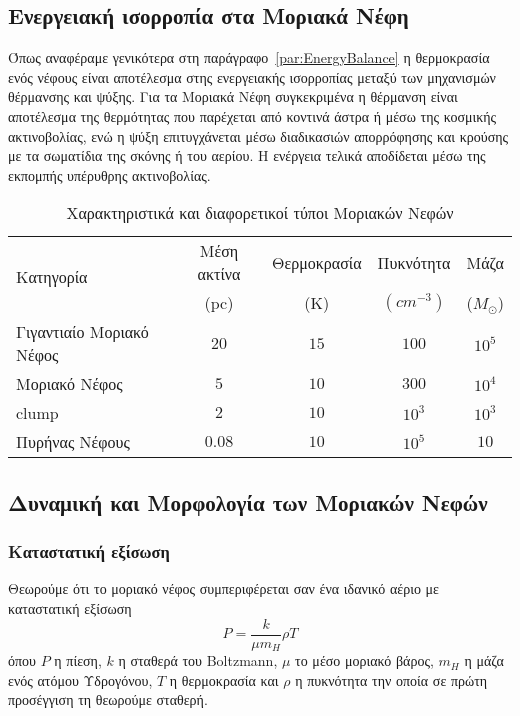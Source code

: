 \documentclass[a4paper,11pt]{memoir}
\newcommand{\sm}{$M_{\odot}$}
\begin{document}
\subsection{Ενεργειακή ισορροπία στα Μοριακά Νέφη}
Όπως αναφέραμε γενικότερα στη παράγραφο~\ref{par:EnergyBalance} η θερμοκρασία ενός νέφους είναι αποτέλεσμα στης ενεργειακής ισορροπίας μεταξύ των μηχανισμών θέρμανσης και ψύξης. Για τα Μοριακά Νέφη συγκεκριμένα η θέρμανση είναι αποτέλεσμα της θερμότητας που παρέχεται από κοντινά άστρα ή μέσω της κοσμικής ακτινοβολίας, ενώ η ψύξη επιτυγχάνεται μέσω διαδικασιών απορρόφησης και κρούσης με τα σωματίδια της σκόνης ή του αερίου.
Η ενέργεια τελικά αποδίδεται μέσω της εκπομπής υπέρυθρης ακτινοβολίας.

%
\begin{table}
	\caption{Χαρακτηριστικά και διαφορετικοί τύποι Μοριακών Νεφών}
	\label{tab:MCtypes}
	\begin{tabular}{l c c c c}
		\toprule
		\multirow{2}{*}{Κατηγορία} & Μέση ακτίνα &  Θερμοκρασία & Πυκνότητα \ce{H2} & Μάζα \\ 
		& (pc) & (K) & $(cm^{-3})$ & (\sm) \\
		\midrule
		Γιγαντιαίο Μοριακό Νέφος & $20$ & $15$ & $100$ & $10^5$ \\
		Μοριακό Νέφος & $5$ & $10$ & $300$ & $10^4$\\
		clump & $2$ & $10$ & $10^3$ & $10^3$\\
		Πυρήνας Νέφους & $0.08$ & $10$ & $10^5$ & $10$\\
		\bottomrule
	\end{tabular}
\end{table}

\subsection{Δυναμική και Μορφολογία των Μοριακών Νεφών}
\subsubsection{Καταστατική εξίσωση}
Θεωρούμε ότι το μοριακό νέφος συμπεριφέρεται σαν ένα ιδανικό αέριο με καταστατική εξίσωση
\begin{equation}
P=\frac{k}{\mu m_{H}} \rho T
\end{equation}
όπου $P$ η πίεση, $k$ η σταθερά του Boltzmann, $\mu$ το μέσο μοριακό βάρος, $m_{H}$ η μάζα ενός ατόμου Υδρογόνου, $T$ η θερμοκρασία και $\rho$ η πυκνότητα την οποία σε πρώτη προσέγγιση τη θεωρούμε σταθερή.
\end{document}
